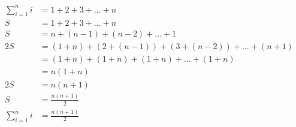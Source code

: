 \documentclass{article}
\begin{document}
	\begin{align}
	\sum_{i = 1}^{n} i & = 1 + 2 + 3 + ... + n \\
	S & = 1 + 2 + 3 + ... + n \\
	S & = n + (n - 1) + (n - 2) + ... + 1 \\
	2S & = (1 + n) + (2 + (n - 1)) + (3 + (n - 2)) + ... + (n + 1) \\
	& = (1 + n) + (1 + n) + (1 + n) + ... + (1 + n) \\
	& = n(1 + n) \\
	2S & = n(n + 1) \\
	S & = \frac{n(n + 1)}{2} \\
	\sum_{i = 1}^{n} i & = \frac{n(n + 1)}{2}
	\end{align}
\end{document}
